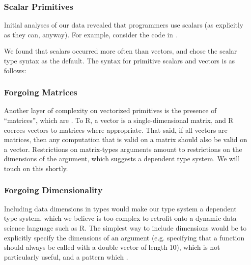 \documentclass[acmsmall,review,anonymous]{acmart}\settopmatter{printfolios=true,printccs=false,printacmref=false}
\begin{document}
%
%
\subsubsection{Scalar Primitives}

Initial analyses of our data revealed that programmers  use scalars (as explicitly as they can, anyway).
For example, consider the code in .

We found that scalars occurred more often than vectors, and chose the scalar type syntax as the default.
The syntax for primitive scalars and vectors is as follows:

 
%
%
\subsubsection{Forgoing Matrices}

Another layer of complexity on vectorized primitives is the presence of ``matrices'', which are .
To R, a vector is a single-dimensional matrix, and R coerces vectors to matrices where appropriate.
That said, if all vectors are matrices, then any computation that is valid on a matrix should also be valid on a vector.
Restrictions on matrix-types arguments amount to restrictions on the dimensions of the argument, which suggests a dependent type system.
We will touch on this shortly.
 
%
%
\subsubsection{Forgoing Dimensionality} 

Including data dimensions in types would make our type system a dependent type system, which we believe is too complex to retrofit onto a dynamic data science language such as R.
The simplest way to include dimensions would be to explicitly specify the dimensions of an argument (e.g. specifying that a function should always be called with a double vector of length 10), which is not particularly useful, and a pattern which .
\end{document}
